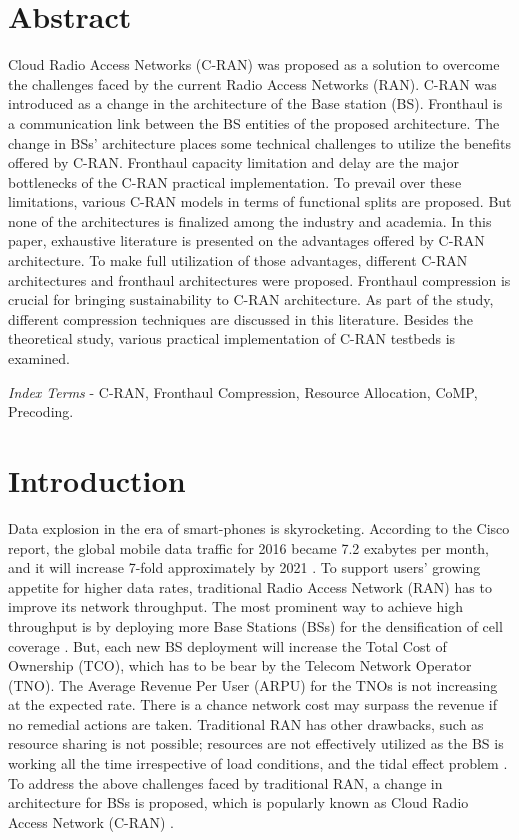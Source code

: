 \begin{multicols}{2}

\section*{Abstract}

Cloud Radio Access Networks (C-RAN) was proposed as a solution to overcome the challenges faced by the current Radio Access Networks (RAN). C-RAN was introduced as a change in the architecture of the Base station (BS). Fronthaul is a communication link between the BS entities of the proposed architecture. The change in BSs’ architecture places some technical challenges to utilize the benefits offered by C-RAN. Fronthaul capacity limitation and delay are the major bottlenecks of the C-RAN practical implementation. To prevail over these limitations, various C-RAN models in terms of functional splits are proposed. But none of the architectures is finalized among the industry and academia. In this paper, exhaustive literature is presented on the advantages offered by C-RAN architecture. To make full utilization of those advantages, different C-RAN architectures and fronthaul architectures were proposed. Fronthaul compression is crucial for bringing sustainability to C-RAN architecture. As part of the study, different compression techniques are discussed in this literature. Besides the theoretical study, various practical implementation of C-RAN testbeds is examined.

\textit{Index Terms} - C-RAN, Fronthaul Compression, Resource Allocation, CoMP, Precoding.

\section{Introduction}

Data explosion in the era of smart-phones is skyrocketing. According to the Cisco report, the global mobile data traffic for 2016 became 7.2 exabytes per month, and it will increase 7-fold approximately by 2021 \cite{art3-key01}. To support users’ growing appetite for higher data rates, traditional Radio Access Network (RAN) has to improve its network throughput. The most prominent way to achieve high throughput is by deploying more Base Stations (BSs) for the densification of cell coverage \cite{art3-key02}. But, each new BS deployment will increase the Total Cost of Ownership (TCO), which has to be bear by the Telecom Network Operator (TNO). The Average Revenue Per User (ARPU) for the TNOs is not increasing at the expected rate. There is a chance network cost may surpass the revenue if no remedial actions are taken. Traditional RAN has other drawbacks, such as resource sharing is not possible; resources are not effectively utilized as the BS is working all the time irrespective of load conditions, and the tidal effect problem \cite{art3-key03}. To address the above challenges faced by traditional RAN, a change in architecture for BSs is proposed, which is popularly known as Cloud Radio Access Network (C-RAN) \cite{art3-key04}.


\end{multicols}
